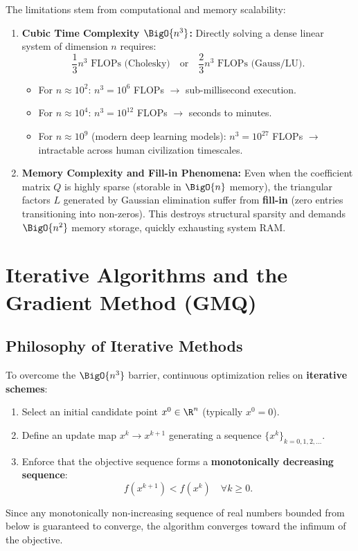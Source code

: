 The limitations stem from computational and memory scalability:
\begin{enumerate}
    \item \textbf{Cubic Time Complexity $\BigO{n^3}$:}
    Directly solving a dense linear system of dimension $n$ requires:
    \begin{equation}
        \frac{1}{3} n^3 \text{ FLOPs (Cholesky)} \quad \text{or} \quad \frac{2}{3} n^3 \text{ FLOPs (Gauss/LU)}.
    \end{equation}
    \begin{itemize}
        \item For $n \approx 10^2$: $n^3 = 10^6$ FLOPs $\longrightarrow$ sub-millisecond execution.
        \item For $n \approx 10^4$: $n^3 = 10^{12}$ FLOPs $\longrightarrow$ seconds to minutes.
        \item For $n \approx 10^9$ (modern deep learning models): $n^3 = 10^{27}$ FLOPs $\longrightarrow$ intractable across human civilization timescales.
    \end{itemize}

    \item \textbf{Memory Complexity and Fill-in Phenomena:}
    Even when the coefficient matrix $Q$ is highly sparse (storable in $\BigO{n}$ memory), the triangular factors $L$ generated by Gaussian elimination suffer from \textbf{fill-in} (zero entries transitioning into non-zeros). This destroys structural sparsity and demands $\BigO{n^2}$ memory storage, quickly exhausting system RAM.
\end{enumerate}


\FloatBarrier
\section{Iterative Algorithms and the Gradient Method (GMQ)}
\label{sec:iterative-algorithms-gmq}

\subsection{Philosophy of Iterative Methods}
To overcome the $\BigO{n^3}$ barrier, continuous optimization relies on \textbf{iterative schemes}:
\begin{enumerate}
    \item Select an initial candidate point $x^0 \in \R^n$ (typically $x^0 = 0$).
    \item Define an update map $x^k \to x^{k+1}$ generating a sequence $\{x^k\}_{k=0, 1, 2, \dots}$.
    \item Enforce that the objective sequence forms a \textbf{monotonically decreasing sequence}:
    \begin{equation}
        f(x^{k+1}) < f(x^k) \quad \forall k \ge 0.
    \end{equation}
\end{enumerate}
Since any monotonically non-increasing sequence of real numbers bounded from below is guaranteed to converge, the algorithm converges toward the infimum of the objective.

